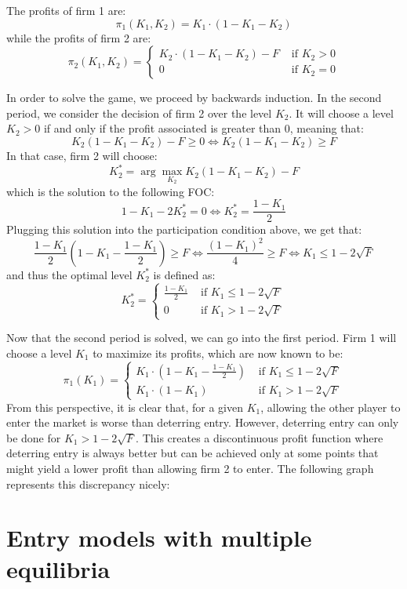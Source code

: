 The profits of firm 1 are: $$\pi_1(K_1, K_2) = K_1\cdot (1 - K_1 - K_2) $$
while the profits of firm 2 are: $$ \pi_2(K_1, K_2) = \begin{cases}
K_2\cdot (1 - K_1 - K_2) - F & \text{ if } K_2 > 0 \\
0 & \text{ if } K_2 = 0
\end{cases} $$

In order to solve the game, we proceed by backwards induction. In the second period, we consider the decision of firm 2 over the level $K_2$. It will choose a level $K_2 > 0$ if and only if the profit associated is greater than 0, meaning that: $$ K_2 (1 - K_1 - K_2) - F \geq 0 \Leftrightarrow K_2 (1 - K_1 - K_2) \geq F $$ In that case, firm 2 will choose: $$K_2^* = \arg\max_{K_2} K_2 (1 - K_1 - K_2) - F $$ which is the solution to the following FOC: $$1 - K_1 - 2K_2^* = 0 \Leftrightarrow K_2^* = \frac{1 - K_1}{2} $$ Plugging this solution into the participation condition above, we get that: $$  \frac{1 - K_1}{2} (1 - K_1 - \frac{1 - K_1}{2}) \geq F \Leftrightarrow \frac{(1 - K_1)^2}{4} \geq F \Leftrightarrow K_1 \leq 1 - 2\sqrt{F} $$
and thus the optimal level $K_2^*$ is defined as: $$ K_2^* = \begin{cases}
\frac{1 - K_1}{2} & \text{ if } K_1 \leq 1 - 2\sqrt{F} \\
0 & \text{ if } K_1 > 1 - 2\sqrt{F}
\end{cases} $$

Now that the second period is solved, we can go into the first period. Firm 1 will choose a level $K_1$ to maximize its profits, which are now known to be: $$\pi_1(K_1) = \begin{cases}
K_1 \cdot \left(1 - K_1 - \frac{1 - K_1}{2}\right) & \text{ if } K_1 \leq 1 - 2\sqrt{F} \\
K_1\cdot (1 - K_1) & \text{ if } K_1 > 1 - 2\sqrt{F}
\end{cases} $$ From this perspective, it is clear that, for a given $K_1$, allowing the other player to enter the market is worse than deterring entry. However, deterring entry can only be done for $K_1 > 1 - 2\sqrt{F}$. This creates a discontinuous profit function where deterring entry is always better but can be achieved only at some points that might yield a lower profit than allowing firm 2 to enter. The following graph represents this discrepancy nicely:

\section{Entry models with multiple equilibria}

